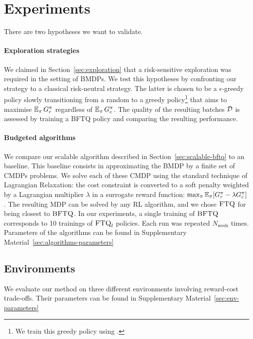 \documentclass{article}
\begin{document}
\section{Experiments}
\label{sec:experiements}
There are two hypotheses we want to validate.

\paragraph{Exploration strategies} We claimed in Section~\ref{sec:exploration} that a risk-sensitive exploration was required in the setting of BMDPs. We test this hypotheses by confronting our strategy to a classical risk-neutral strategy. The latter is chosen to be a $\epsilon$-greedy policy slowly transitioning from a random to a greedy policy\footnote{We train this greedy policy using \FTQ.} that aims to maximise $\operatorname*{\mathbb{E}}_{\pi} G_r^\pi$ regardless of $\operatorname*{\mathbb{E}}_{\pi} G_c^\pi$. The quality of the resulting batches $\mathcal{D}$ is assessed by training a BFTQ policy and comparing the resulting performance.

\paragraph{Budgeted algorithms} We compare our  scalable \BFTQ algorithm described in Section~\ref{sec:scalable-bftq} to an \FTQl baseline. This baseline consists in approximating the BMDP by a finite set of CMDPs problems. We solve each of these CMDP using the standard technique of Lagrangian Relaxation: the cost constraint is converted to a soft penalty weighted by a Lagrangian multiplier $\lambda$ in a surrogate reward function: $\max_{\pi} \operatorname*{\mathbb{E}}_{\pi}[G_r^\pi - \lambda G_c^\pi]$. The resulting MDP can be solved by any RL algorithm, and we chose $\textrm{\textsc{FTQ}}$ for being closest to $\textrm{\textsc{BFTQ}}$.
In our experiments, a single training of $\textrm{\textsc{BFTQ}}$ corresponds to 10 trainings of $\textrm{\textsc{FTQ}}_l$ policies. Each run was repeated $N_{\text{seeds}}$ times. Parameters of the algorithms can be found in Supplementary Material~\ref{sec:algorithms-parameters}

\subsection{Environments}

We evaluate our method on three different environments involving reward-cost trade-offs. Their parameters can be found in Supplementary Material~\ref{sec:env-parameters}
\end{document}
